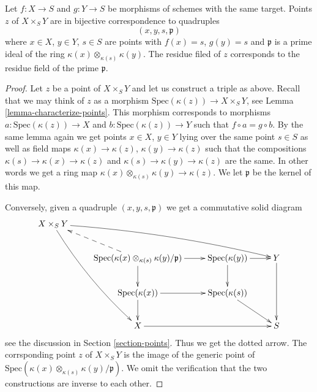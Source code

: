 \begin{lemma}
\label{lemma-points-fibre-product}
Let $f : X \to S$ and $g : Y \to S$ be morphisms of schemes
with the same target. Points $z$ of $X \times_S Y$ are in bijective
correspondence to quadruples
$$
(x, y, s, \mathfrak p)
$$
where $x \in X$, $y \in Y$, $s \in S$ are points with
$f(x) = s$, $g(y) = s$ and $\mathfrak p$ is a prime ideal
of the ring $\kappa(x) \otimes_{\kappa(s)} \kappa(y)$.
The residue filed of $z$ corresponds to
the residue field of the prime $\mathfrak p$.
\end{lemma}

\begin{proof}
Let $z$ be a point of $X \times_S Y$ and let us construct a
triple as above. Recall that we may think of $z$ as a morphism
$\text{Spec}(\kappa(z)) \to X \times_S Y$, see
Lemma \ref{lemma-characterize-points}. This morphism corresponds
to morphisms $a : \text{Spec}(\kappa(z)) \to X$
and $b : \text{Spec}(\kappa(z)) \to Y$ such that
$f \circ a = g \circ b$. By the same lemma again
we get points $x \in X$, $y \in Y$ lying over the same point
$s \in S$ as well as field maps $\kappa(x) \to \kappa(z)$,
$\kappa(y) \to \kappa(z)$ such that the compositions
$\kappa(s) \to \kappa(x) \to \kappa(z)$
and
$\kappa(s) \to \kappa(y) \to \kappa(z)$
are the same. In other words we get a ring map
$\kappa(x) \otimes_{\kappa(s)} \kappa(y) \to \kappa(z)$.
We let $\mathfrak p$ be the kernel of this map.

\medskip\noindent
Conversely, given a quadruple $(x, y, s, \mathfrak p)$ we get a
commutative solid diagram
$$
\xymatrix{
X \times_S Y
\ar@/_/[dddr] \ar@/^/[rrrd]
& & & \\
&
\text{Spec}(\kappa(x) \otimes_{\kappa(s)} \kappa(y)/\mathfrak p)
\ar[r] \ar[d] \ar@{-->}[lu]
&
\text{Spec}(\kappa(y)) \ar[d] \ar[r] &
Y \ar[dd] \\
&
\text{Spec}(\kappa(x)) \ar[r] \ar[d] &
\text{Spec}(\kappa(s)) \ar[rd] &
\\
&
X \ar[rr] &
&
S
}
$$
see the discussion in Section \ref{section-points}. Thus we get the
dotted arrow. The corrsponding point $z$ of $X \times_S Y$ is the
image of the generic point of
$\text{Spec}(\kappa(x) \otimes_{\kappa(s)} \kappa(y)/\mathfrak p)$.
We omit the verification that the two constructions are inverse
to each other.
\end{proof}

